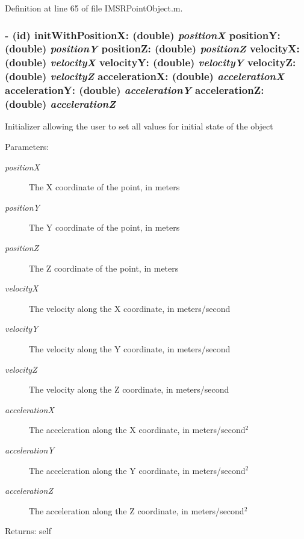 Definition at line 65 of file IMSRPointObject.m.\hypertarget{interface_i_m_s_r_point_object_0251ecd091ae3e8a0840a6b6ab35be0b}{
\subsubsection[{initWithPositionX:positionY:positionZ:velocityX:velocityY:velocityZ:accelerationX:accelerationY:accelerationZ:}]{\setlength{\rightskip}{0pt plus 5cm}- (id) initWithPositionX: (double) {\em positionX}\/ positionY: (double) {\em positionY}\/ positionZ: (double) {\em positionZ}\/ velocityX: (double) {\em velocityX}\/ velocityY: (double) {\em velocityY}\/ velocityZ: (double) {\em velocityZ}\/ accelerationX: (double) {\em accelerationX}\/ accelerationY: (double) {\em accelerationY}\/ accelerationZ: (double) {\em accelerationZ}}}
\label{interface_i_m_s_r_point_object_0251ecd091ae3e8a0840a6b6ab35be0b}


Initializer allowing the user to set all values for initial state of the object

\begin{Desc}
\item[Parameters:]
\begin{description}
\item[{\em positionX}]The X coordinate of the point, in meters \item[{\em positionY}]The Y coordinate of the point, in meters \item[{\em positionZ}]The Z coordinate of the point, in meters \item[{\em velocityX}]The velocity along the X coordinate, in meters/second \item[{\em velocityY}]The velocity along the Y coordinate, in meters/second \item[{\em velocityZ}]The velocity along the Z coordinate, in meters/second \item[{\em accelerationX}]The acceleration along the X coordinate, in meters/second$^{\mbox{2}}$  \item[{\em accelerationY}]The acceleration along the Y coordinate, in meters/second$^{\mbox{2}}$  \item[{\em accelerationZ}]The acceleration along the Z coordinate, in meters/second$^{\mbox{2}}$ \end{description}
\end{Desc}
\begin{Desc}
\item[Returns:]self \end{Desc}


